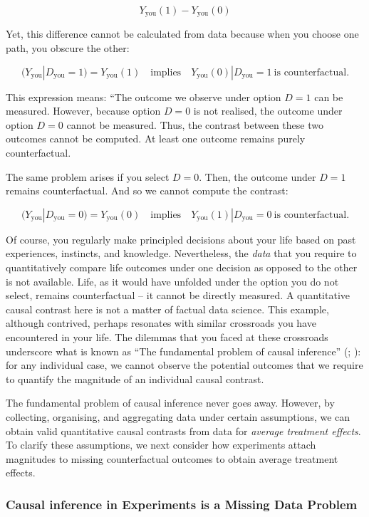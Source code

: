\documentclass[
  singlecolumn]{article}
\begin{document}
\[Y_{\text{you}}(1) - Y_{\text{you}}(0)\]

Yet, this difference cannot be calculated from data because when you
choose one path, you obscure the other:

\[
(Y_{\text{you}}|D_{\text{you}} = 1) = Y_{\text{you}}(1) \quad \text{implies} \quad Y_{\text{you}}(0)|D_{\text{you}} = 1~ \text{is counterfactual}.
\]

This expression means: ``The outcome we observe under option \(D = 1\)
can be measured. However, because option \(D = 0\) is not realised, the
outcome under option \(D=0\) cannot be measured. Thus, the contrast
between these two outcomes cannot be computed. At least one outcome
remains purely counterfactual.

The same problem arises if you select \(D = 0\). Then, the outcome under
\(D=1\) remains counterfactual. And so we cannot compute the contrast:

\[
(Y_{\text{you}}|D_{\text{you}} = 0) = Y_{\text{you}}(0) \quad \text{implies} \quad Y_{\text{you}}(1)|D_{\text{you}} = 0~ \text{is counterfactual}.
\]

Of course, you regularly make principled decisions about your life based
on past experiences, instincts, and knowledge. Nevertheless, the
\emph{data} that you require to quantitatively compare life outcomes
under one decision as opposed to the other is not available. Life, as it
would have unfolded under the option you do not select, remains
counterfactual -- it cannot be directly measured. A quantitative causal
contrast here is not a matter of factual data science. This example,
although contrived, perhaps resonates with similar crossroads you have
encountered in your life. The dilemmas that you faced at these
crossroads underscore what is known as ``The fundamental problem of
causal inference'' (;
): for any individual case, we
cannot observe the potential outcomes that we require to quantify the
magnitude of an individual causal contrast.

The fundamental problem of causal inference never goes away. However, by
collecting, organising, and aggregating data under certain assumptions,
we can obtain valid quantitative causal contrasts from data for
\emph{average treatment effects}. To clarify these assumptions, we next
consider how experiments attach magnitudes to missing counterfactual
outcomes to obtain average treatment effects.

\subsubsection{Causal inference in Experiments is a Missing Data
Problem}\label{causal-inference-in-experiments-is-a-missing-data-problem}
\end{document}
